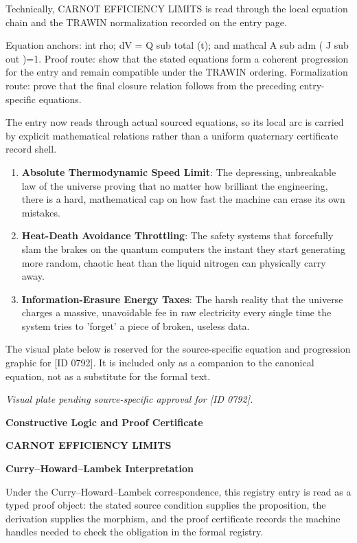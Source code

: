 Technically, CARNOT EFFICIENCY LIMITS is read through the local equation chain and the TRAWIN normalization recorded on the entry page.

Equation anchors: int rho; dV = Q sub total (t); and mathcal A sub adm ( J sub out )=1. Proof route: show that the stated equations form a coherent progression for the entry and remain compatible under the TRAWIN ordering. Formalization route: prove that the final closure relation follows from the preceding entry-specific equations.

The entry now reads through actual sourced equations, so its local arc is carried by explicit mathematical relations rather than a uniform quaternary certificate record shell.
\endgroup

\begin{enumerate}[leftmargin=1.6em,itemsep=6pt,topsep=4pt]
\item \textbf{Absolute Thermodynamic Speed Limit}: The depressing, unbreakable law of the universe proving that no matter how brilliant the engineering, there is a hard, mathematical cap on how fast the machine can erase its own mistakes.
\item \textbf{Heat-Death Avoidance Throttling}: The safety systems that forcefully slam the brakes on the quantum computers the instant they start generating more random, chaotic heat than the liquid nitrogen can physically carry away.
\item \textbf{Information-Erasure Energy Taxes}: The harsh reality that the universe charges a massive, unavoidable fee in raw electricity every single time the system tries to 'forget' a piece of broken, useless data.
\end{enumerate}

\begingroup\footnotesize\sloppy
The visual plate below is reserved for the source-specific equation and progression graphic for [ID 0792]. It is included only as a companion to the canonical equation, not as a substitute for the formal text.
\par\endgroup
\begingroup\footnotesize\itshape
Visual plate pending source-specific approval for [ID 0792].
\par\endgroup

\clearpage
\begingroup\tzpsupportsetup
\noindent\textbf{\fontsize{10.8pt}{12.8pt}\selectfont [ID 0792] Constructive Logic and Proof Certificate}\par
\noindent\textbf{\fontsize{10pt}{12pt}\selectfont CARNOT EFFICIENCY LIMITS}\par
\vspace{0.45em}
\begingroup
\footnotesize
\setlength{\parskip}{0.22em}
\setlength{\parindent}{0pt}
\noindent\textbf{Curry--Howard--Lambek Interpretation}\par
Under the Curry--Howard--Lambek correspondence, this registry entry is read as a typed proof
object: the stated source condition supplies the proposition, the derivation supplies the
morphism, and the proof certificate records the machine handles needed to check the obligation
in the formal registry.

